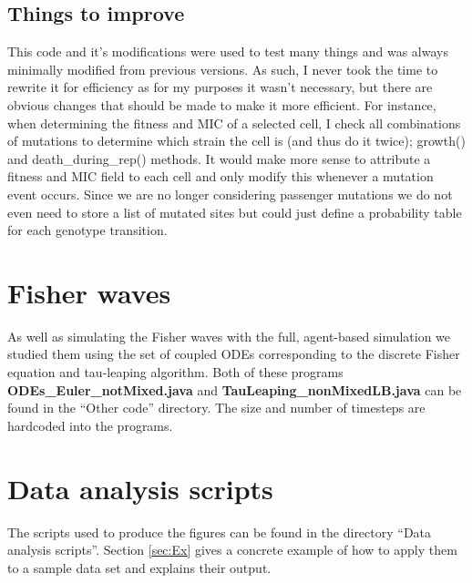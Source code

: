 \documentclass[a4paper,10pt]{article}
\begin{document}
\subsection{Things to improve}
This code and it's modifications were used to test many things and was always minimally modified from previous versions. As such, I never took the time to
rewrite it for efficiency as for my purposes it wasn't necessary, but there are obvious changes that should be made to make it more efficient. 
For instance, when determining the fitness and MIC of a selected cell, I check all combinations of mutations to determine which strain the cell is
(and thus do it twice); growth() and death\_during\_rep() methods.
It would make more sense to attribute a fitness and MIC field to each cell and only modify this whenever a mutation event occurs.
Since we are no longer considering passenger mutations we do not even need to store a list of mutated sites but could just define a probability table
for each genotype transition. 



 


 
 
\section{Fisher waves}
As well as simulating the Fisher waves with the full, agent-based simulation we studied them using the set of coupled ODEs corresponding to the discrete Fisher equation
and tau-leaping algorithm. Both of these programs {\bf ODEs\_Euler\_notMixed.java} and {\bf TauLeaping\_nonMixedLB.java} can be found in the ``Other code'' directory.
The size and number of timesteps are hardcoded into the programs. 







 

 
 \clearpage
 \newpage
 

\section{Data analysis scripts}
The scripts used to produce the figures can be found in the directory ``Data analysis scripts''.
Section \ref{sec:Ex} gives a concrete example of how to apply them to a sample data set and explains their output.
\end{document}
